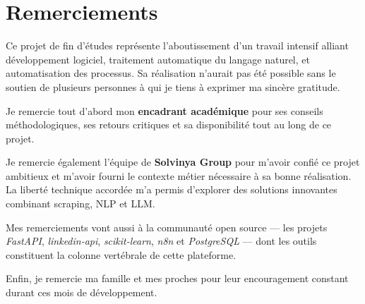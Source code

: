 \chapter*{Remerciements}
\thispagestyle{empty}

Ce projet de fin d'études représente l'aboutissement d'un travail intensif alliant
développement logiciel, traitement automatique du langage naturel, et automatisation
des processus. Sa réalisation n'aurait pas été possible sans le soutien de plusieurs
personnes à qui je tiens à exprimer ma sincère gratitude.

\vspace{0.5cm}

Je remercie tout d'abord mon \textbf{encadrant académique} pour ses conseils
méthodologiques, ses retours critiques et sa disponibilité tout au long de ce
projet.

\vspace{0.4cm}

Je remercie également l'équipe de \textbf{Solvinya Group} pour m'avoir confié
ce projet ambitieux et m'avoir fourni le contexte métier nécessaire à sa bonne
réalisation. La liberté technique accordée m'a permis d'explorer des solutions
innovantes combinant scraping, NLP et LLM.

\vspace{0.4cm}

Mes remerciements vont aussi à la communauté open source — les projets
\textit{FastAPI}, \textit{linkedin-api}, \textit{scikit-learn}, \textit{n8n} et
\textit{PostgreSQL} — dont les outils constituent la colonne vertébrale de cette
plateforme.

\vspace{0.4cm}

Enfin, je remercie ma famille et mes proches pour leur encouragement constant
durant ces mois de développement.

\newpage
